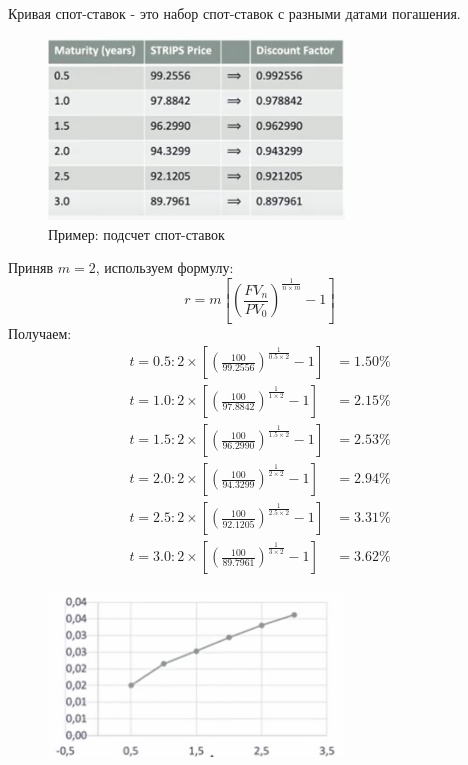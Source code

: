 \documentclass{article}
\begin{document}
Кривая спот-ставок - это набор спот-ставок с разными датами погашения.
\begin{figure}[h]
\centering
\includegraphics[width=0.7\textwidth]{2.png}
\caption{Пример: подсчет спот-ставок}
\label{loadings}
\end{figure}
Приняв $m=2$, используем формулу:
\begin{equation*}
    r = m[(\frac{FV_n}{PV_0})^\frac{1}{n\times m} - 1]
\end{equation*}
Получаем:
\begin{align*}
    t=0.5: 2\times [(\frac{100}{99.2556})^\frac{1}{0.5\times 2} - 1] &= 1.50\%
    \\
    t=1.0: 2\times [(\frac{100}{97.8842})^\frac{1}{1\times 2} - 1] &= 2.15\%
    \\
    t=1.5: 2\times [(\frac{100}{96.2990})^\frac{1}{1.5\times 2} - 1] &= 2.53\%
    \\
    t=2.0: 2\times [(\frac{100}{94.3299})^\frac{1}{2\times 2} - 1] &= 2.94\%
    \\
     t=2.5: 2\times [(\frac{100}{92.1205})^\frac{1}{2.5\times 2} - 1] &= 3.31\%
    \\
     t=3.0: 2\times [(\frac{100}{89.7961})^\frac{1}{3\times 2} - 1] &= 3.62\%
\end{align*}

\begin{figure}[h]
\centering
\includegraphics[width=0.7\textwidth]{3.png}
\label{loadings}
\end{figure}
\end{document}
